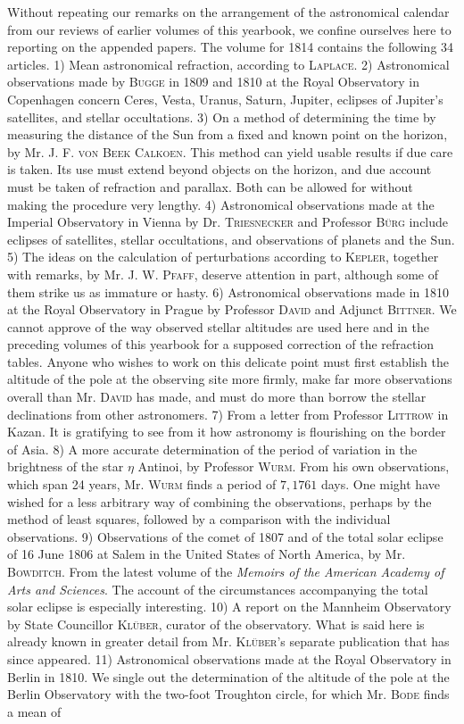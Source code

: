 Without repeating our remarks on the arrangement of the astronomical calendar from our reviews of earlier volumes of this yearbook, we confine ourselves here to reporting on the appended papers. The volume for 1814 contains the following 34 articles. 1) Mean astronomical refraction, according to \textsc{Laplace}. 2) Astronomical observations made by \textsc{Bugge} in 1809 and 1810 at the Royal Observatory in Copenhagen concern Ceres, Vesta, Uranus, Saturn, Jupiter, eclipses of Jupiter's satellites, and stellar occultations. 3) On a method of determining the time by measuring the distance of the Sun from a fixed and known point on the horizon, by Mr. J. F. \textsc{von Beek Calkoen}. This method can yield usable results if due care is taken. Its use must extend beyond objects on the horizon, and due account must be taken of refraction and parallax. Both can be allowed for without making the procedure very lengthy. 4) Astronomical observations made at the Imperial Observatory in Vienna by Dr. \textsc{Triesnecker} and Professor \textsc{Bürg} include eclipses of satellites, stellar occultations, and observations of planets and the Sun. 5) The ideas on the calculation of perturbations according to \textsc{Kepler}, together with remarks, by Mr. J. W. \textsc{Pfaff}, deserve attention in part, although some of them strike us as immature or hasty. 6) Astronomical observations made in 1810 at the Royal Observatory in Prague by Professor \textsc{David} and Adjunct \textsc{Bittner}. We cannot approve of the way observed stellar altitudes are used here and in the preceding volumes of this yearbook for a supposed correction of the refraction tables. Anyone who wishes to work on this delicate point must first establish the altitude of the pole at the observing site more firmly, make far more observations overall than Mr. \textsc{David} has made, and must do more than borrow the stellar declinations from other astronomers. 7) From a letter from Professor \textsc{Littrow} in Kazan. It is gratifying to see from it how astronomy is flourishing on the border of Asia. 8) A more accurate determination of the period of variation in the brightness of the star $\eta$ Antinoi, by Professor \textsc{Wurm}. From his own observations, which span 24 years, Mr. \textsc{Wurm} finds a period of $7{,}1761$ days. One might have wished for a less arbitrary way of combining the observations, perhaps by the method of least squares, followed by a comparison with the individual observations. 9) Observations of the comet of 1807 and of the total solar eclipse of 16 June 1806 at Salem in the United States of North America, by Mr. \textsc{Bowditch}. From the latest volume of the \emph{Memoirs of the American Academy of Arts and Sciences}. The account of the circumstances accompanying the total solar eclipse is especially interesting. 10) A report on the Mannheim Observatory by State Councillor \textsc{Klüber}, curator of the observatory. What is said here is already known in greater detail from Mr. \textsc{Klüber}'s separate publication that has since appeared. 11) Astronomical observations made at the Royal Observatory in Berlin in 1810. We single out the determination of the altitude of the pole at the Berlin Observatory with the two-foot Troughton circle, for which Mr. \textsc{Bode} finds a mean of 